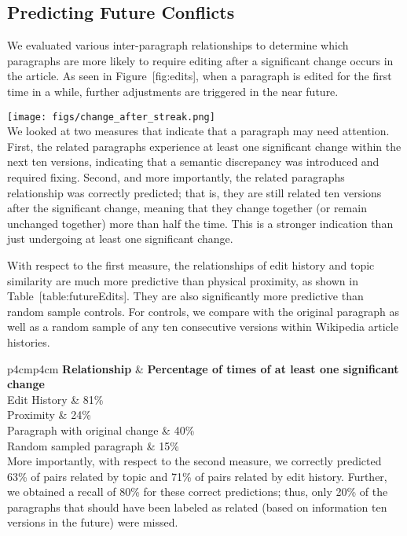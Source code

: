 \subsection{Predicting Future
Conflicts}\label{predicting-future-conflicts-1}

We evaluated various inter-paragraph relationships to determine which
paragraphs are more likely to require editing after a significant change
occurs in the article. As seen in Figure~{[}fig:edits{]}, when a
paragraph is edited for the first time in a while, further adjustments
are triggered in the near future.

\texttt{[image: figs/change\_after\_streak.png]}\\

We looked at two measures that indicate that a paragraph may need
attention. First, the related paragraphs experience at least one
significant change within the next ten versions, indicating that a
semantic discrepancy was introduced and required fixing. Second, and
more importantly, the related paragraphs relationship was correctly
predicted; that is, they are still related ten versions after the
significant change, meaning that they change together (or remain
unchanged together) more than half the time. This is a stronger
indication than just undergoing at least one significant change.

With respect to the first measure, the relationships of edit history and
topic similarity are much more predictive than physical proximity, as
shown in Table~{[}table:futureEdits{]}. They are also significantly more
predictive than random sample controls. For controls, we compare with
the original paragraph as well as a random sample of any ten consecutive
versions within Wikipedia article histories.

{\textbar{}p{4cm}\textbar{}p{4cm}\textbar{}} \textbf{Relationship} \&
\textbf{Percentage of times of at least one significant change}\\Edit
History \& 81\%\\

Proximity \& 24\%\\

Paragraph with original change \& 40\%\\

Random sampled paragraph \& 15\%\\

More importantly, with respect to the second measure, we correctly
predicted 63\% of pairs related by topic and 71\% of pairs related by
edit history. Further, we obtained a recall of 80\% for these correct
predictions; thus, only 20\% of the paragraphs that should have been
labeled as related (based on information ten versions in the future)
were missed.

